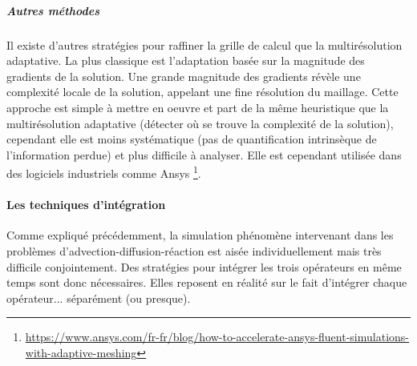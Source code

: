         \subparagraph{Autres méthodes}
        Il existe d'autres stratégies pour raffiner la grille de calcul que la multirésolution adaptative.
        La plus classique est l'adaptation basée sur la magnitude des gradients de la solution. Une grande magnitude des gradients révèle une complexité locale de la solution,
        appelant une fine résolution du maillage. Cette approche est simple à mettre en oeuvre et part de la même heuristique 
        que la multirésolution adaptative (détecter où se trouve la complexité de la solution), cependant elle est moins systématique (pas de quantification intrinsèque de l'information perdue) et plus difficile à analyser. 
        Elle est cependant utilisée dans des logiciels industriels comme Ansys 
        \footnote{\href{https://w.ww.ansys.com/fr-fr/blog/how-to-accelerate-ansys-fluent-simulations-with-adaptive-meshing}{https://www.ansys.com/fr-fr/blog/how-to-accelerate-ansys-fluent-simulations-with-adaptive-meshing}}.

    \paragraph{Les techniques d'intégration}
        Comme expliqué précédemment, la simulation phénomène intervenant dans les problèmes d'advection-diffusion-réaction est aisée individuellement mais très difficile conjointement.
        Des stratégies pour intégrer les trois opérateurs en même temps sont donc nécessaires. Elles reposent en réalité sur le fait d'intégrer chaque opérateur... séparément (ou presque).


